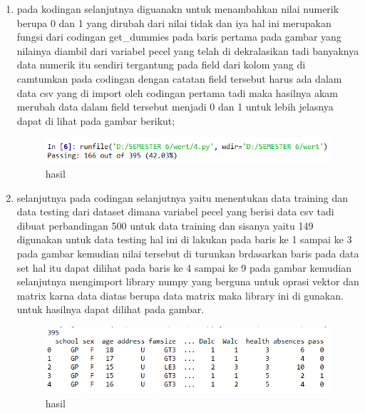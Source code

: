 \begin{enumerate}
\item pada kodingan selanjutnya diguanakn untuk menambahkan nilai numerik berupa 0 dan 1 yang dirubah dari nilai tidak dan iya hal ini merupakan fungsi dari codingan get\_dummies pada baris pertama pada gambar yang nilainya diambil dari variabel pecel yang telah di dekralasikan tadi banyaknya data numerik itu sendiri tergantung pada field dari kolom yang di camtumkan pada codingan dengan catatan field tersebut harus ada dalam data csv yang di import oleh codingan pertama tadi maka hasilnya akam merubah data dalam field tersebut menjadi 0 dan 1 untuk lebih jelasnya dapat di lihat pada gambar berikut; 

\begin{figure}[ht]
\centering
\includegraphics[scale=0.5]{figures/1174050/chapter2/12.PNG}
\caption{hasil}
\label{contoh}
\end{figure}

\item selanjutnya pada codingan selanjutnya yaitu menentukan data training dan data testing dari dataset dimana variabel pecel yang berisi data csv tadi dibuat perbandingan 500 untuk data training dan sisanya yaitu 149 digunakan untuk data testing hal ini di lakukan pada baris ke 1 sampai ke 3 pada gambar kemudian nilai tersebut di turunkan  brdasarkan baris pada data set hal itu dapat dilihat pada baris ke 4 sampai ke 9 pada gambar kemudian selanjutnya mengimport library numpy yang berguna untuk oprasi vektor dan matrix karna data diatas berupa data matrix maka library ini di gunakan. untuk hasilnya dapat dilihat pada gambar.

\begin{figure}[ht]
\centering
\includegraphics[scale=0.5]{figures/1174050/chapter2/13.PNG}
\caption{hasil}
\label{contoh}
\end{figure}


\end{enumerate}
